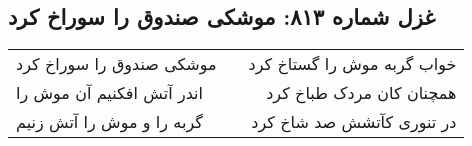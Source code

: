 \begin{center}
\section*{غزل شماره ۸۱۳: موشکی صندوق را سوراخ کرد}
\label{sec:0813}
\begin{longtable}{l p{0.5cm} r}
موشکی صندوق را سوراخ کرد
&&
خواب گربه موش را گستاخ کرد
\\
اندر آتش افکنیم آن موش را
&&
همچنان کان مردک طباخ کرد
\\
گربه را و موش را آتش زنیم
&&
در تنوری کآتشش صد شاخ کرد
\\
\end{longtable}
\end{center}
